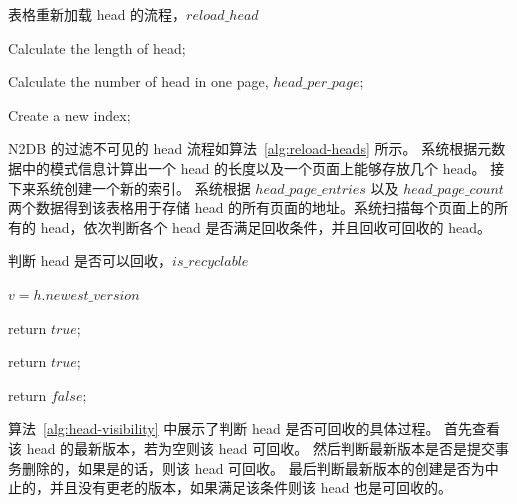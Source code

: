\begin{algorithm}[ht]
    \caption{表格重新加载 head 的流程，$reload\_head$}
    \label{alg:reload-heads}
    \BlankLine

    Calculate the length of head;

    Calculate the number of head in one page, $head\_per\_page$;

    Create a new index;

    {
    }
\end{algorithm}



N2DB 的过滤不可见的 head 流程如算法~\ref{alg:reload-heads} 所示。
系统根据元数据中的模式信息计算出一个 head 的长度以及一个页面上能够存放几个 head。
接下来系统创建一个新的索引。
系统根据 $head\_page\_entries$ 以及 $ head\_page\_count$ 两个数据得到该表格用于存储 head 的所有页面的地址。系统扫描每个页面上的所有的 head，依次判断各个 head 是否满足回收条件，并且回收可回收的 head。

\begin{algorithm}[ht]
    \caption{判断 head 是否可以回收，$is\_recyclable$}
    \label{alg:head-visibility}
    \BlankLine

    $v = h.newest\_version$



     {
        return $true$;
    }

     {
        return $true$;
    }

    return $false$;


\end{algorithm}

算法~\ref{alg:head-visibility} 中展示了判断 head 是否可回收的具体过程。
首先查看该 head 的最新版本，若为空则该 head 可回收。
然后判断最新版本是否是提交事务删除的，如果是的话，则该 head 可回收。
最后判断最新版本的创建是否为中止的，并且没有更老的版本，如果满足该条件则该 head 也是可回收的。

